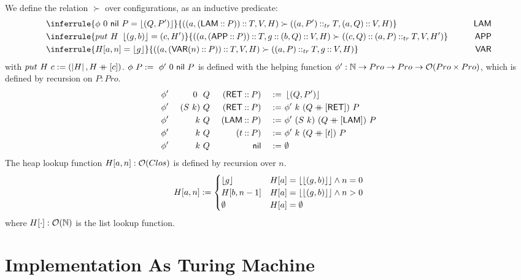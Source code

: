 \begin{definition}
  We define the relation $\succ$ over configurations, as an inductive predicate:
  \begin{alignat*}{2}
    & \inferrule{\phi~0~\nil~P = \Some{(Q, P')}}{\left((a, (\MS{LAM} \cons P)) \cons T, V, H\right) \succ \left((a, P') \cons_{tr} T, (a,Q) \cons V, H\right) }
    \qquad& \MS{LAM} & \\
    & \inferrule{put~H~\Some{(g,b)} = (c,H')}{\left((a, (\MS{APP} \cons P)) \cons T, g \cons (b, Q) \cons V, H\right) \succ \left((c, Q) \cons (a,P) \cons_{tr} T, V, H'\right)}
    \qquad& \MS{APP} \\
    & \inferrule{H[a,n]=\Some{g}}{\left((a, (\MS{VAR}(n) \cons P)) \cons T, V, H\right) \succ \left((a, P) \cons_{tr} T, g \cons V, H\right)}
    \qquad& \MS{VAR} &
  \end{alignat*}
  with $ put~H~c := (\left| H \right|, H \mathbin{+\mkern-10mu+} [c]) $. $\phi~P :=~ \phi'~0~\mathsf{nil}~P$ is defined with the helping function
  $\phi' : \mathbb{N} \rightarrow Pro \rightarrow Pro \rightarrow \mathcal{O}(Pro \times Pro)$, which is defined by recursion on $P:Pro$.
  \begin{alignat*}{4}
    &\phi'&~0~   &~Q&~(\mathsf{RET} \mathbin{::} P) &&~:=~& \left\lfloor {(Q,P')} \right\rfloor \\
    &\phi'&~(S~k)&~Q&~(\mathsf{RET} \mathbin{::} P) &&~:=~& \phi'~k~(Q \mathbin{+\mkern-10mu+} [\mathsf{RET}])~P \\
    &\phi'&~k    &~Q&~(\mathsf{LAM} \mathbin{::} P) &&~:=~& \phi'~(S~k)~(Q \mathbin{+\mkern-10mu+} [\mathsf{LAM}])~P \\
    &\phi'&~k    &~Q&~(t        \mathbin{::} P) &&~:=~& \phi'~k~(Q \mathbin{+\mkern-10mu+} [t])~P \\
    &\phi'&~k    &~Q&~              \mathsf{nil} &&~:=~& \emptyset \\
  \end{alignat*}
  The heap lookup function $H[a,n] : \mathcal{O}(Clos)$ is defined by recursion over $n$.
  \[
    H[a,n] :=
    \begin{cases}
      \left\lfloor {g} \right\rfloor  & H[a]=\left\lfloor {\left\lfloor {(g,b)} \right\rfloor} \right\rfloor \land n=0 \\
      H[b, n-1] & H[a]=\left\lfloor {\left\lfloor {(g,b)} \right\rfloor} \right\rfloor \land n>0 \\
      \emptyset     & H[a]=\emptyset
    \end{cases}
  \]
  where $H[\cdot] : \mathcal{O}(\mathbb{N})$ is the list lookup function.
\end{definition}


\section{Implementation As Turing Machine}
\label{sec:heap-implementation}

